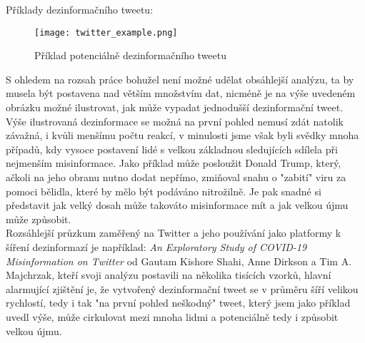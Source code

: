 Příklady dezinformačního tweetu:\\

\begin{figure}[htbp]
  \centering
  \texttt{[image: twitter\_example.png]}
  \caption{Příklad potenciálně dezinformačního tweetu}
  \label{fig:twitter example}
\end{figure}

S ohledem na rozsah práce bohužel není možné udělat obsáhlejší analýzu, ta by musela být postavena nad větším množstvím dat, nicméně je na výše uvedeném obrázku možné ilustrovat, jak může vypadat jednodušší dezinformační tweet.\\

Výše ilustrovaná dezinformace se možná na první pohled nemusí zdát natolik závažná, i kvůli menšímu počtu reakcí, v minulosti jsme však byli svědky mnoha případů, kdy vysoce postavení lidé s velkou základnou sledujících sdílela při nejmenším misinformace. Jako příklad může posloužit Donald Trump, který, ačkoli na jeho obranu nutno dodat nepřímo, zmiňoval snahu o "zabití" viru za pomoci bělidla, které by mělo být podáváno nitrožilně\cite{lol_trump}. Je pak snadné si představit jak velký dosah může takováto misinformace mít a jak velkou újmu může způsobit.\\


Rozsáhlejší průzkum zaměřený na Twitter a jeho používání jako platformy k šíření dezinformazí je například: \textit{An Exploratory Study of COVID-19 Misinformation on Twitter} od Gautam Kishore Shahi, Anne Dirkson a Tim A. Majchrzak, kteří svoji analýzu postavili na několika tisících vzorků\cite{shahi_exploratory_2020}, hlavní alarmující zjištění je, že vytvořený dezinformační tweet se v průměru šíří velikou rychlostí, tedy i tak "na první pohled neškodný" tweet, který jsem jako příklad uvedl výše, může cirkulovat mezi mnoha lidmi a potenciálně tedy i způsobit velkou újmu.\\



